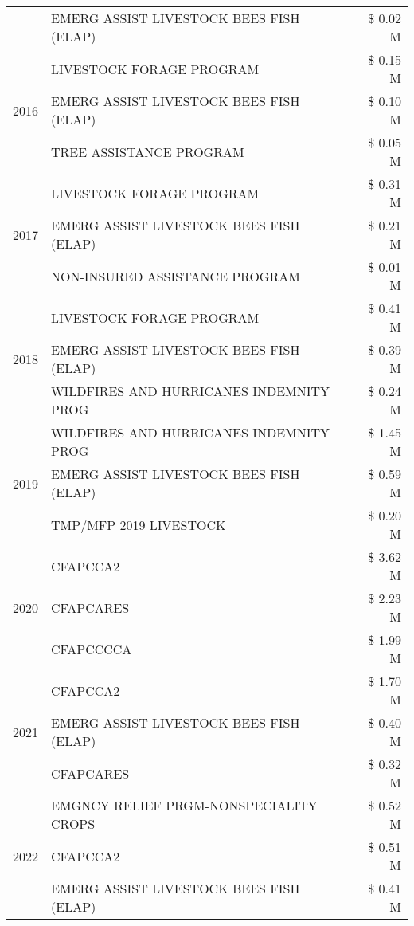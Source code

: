 \begin{tabular}{llr}
 & EMERG ASSIST LIVESTOCK BEES FISH (ELAP) & \$ 0.02 M \\
\cline{1-3}
\multirow[t]{3}{*}{2016} & LIVESTOCK FORAGE PROGRAM & \$ 0.15 M \\
 & EMERG ASSIST LIVESTOCK BEES FISH (ELAP) & \$ 0.10 M \\
 & TREE ASSISTANCE PROGRAM & \$ 0.05 M \\
\cline{1-3}
\multirow[t]{3}{*}{2017} & LIVESTOCK FORAGE PROGRAM & \$ 0.31 M \\
 & EMERG ASSIST LIVESTOCK BEES FISH (ELAP) & \$ 0.21 M \\
 & NON-INSURED ASSISTANCE PROGRAM & \$ 0.01 M \\
\cline{1-3}
\multirow[t]{3}{*}{2018} & LIVESTOCK FORAGE PROGRAM & \$ 0.41 M \\
 & EMERG ASSIST LIVESTOCK BEES FISH (ELAP) & \$ 0.39 M \\
 & WILDFIRES AND HURRICANES INDEMNITY PROG & \$ 0.24 M \\
\cline{1-3}
\multirow[t]{3}{*}{2019} & WILDFIRES AND HURRICANES INDEMNITY PROG & \$ 1.45 M \\
 & EMERG ASSIST LIVESTOCK BEES FISH (ELAP) & \$ 0.59 M \\
 & TMP/MFP 2019 LIVESTOCK & \$ 0.20 M \\
\cline{1-3}
\multirow[t]{3}{*}{2020} & CFAPCCA2 & \$ 3.62 M \\
 & CFAPCARES & \$ 2.23 M \\
 & CFAPCCCCA & \$ 1.99 M \\
\cline{1-3}
\multirow[t]{3}{*}{2021} & CFAPCCA2 & \$ 1.70 M \\
 & EMERG ASSIST LIVESTOCK BEES FISH (ELAP) & \$ 0.40 M \\
 & CFAPCARES & \$ 0.32 M \\
\cline{1-3}
\multirow[t]{3}{*}{2022} & EMGNCY RELIEF PRGM-NONSPECIALITY CROPS & \$ 0.52 M \\
 & CFAPCCA2 & \$ 0.51 M \\
 & EMERG ASSIST LIVESTOCK BEES FISH (ELAP) & \$ 0.41 M \\
\cline{1-3}
\bottomrule
\end{tabular}
